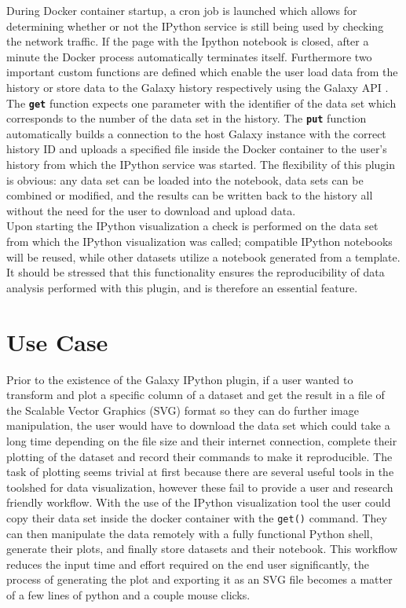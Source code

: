 \documentclass{bioinfo}
\begin{document}
\begin{methods}
During Docker container startup, a cron job is launched which allows for determining whether or not the IPython service is still being used by checking the network traffic. If the page with the Ipython notebook is closed, after a minute the Docker process automatically terminates itself. Furthermore two important custom functions are defined which enable the user load data from the history or store data to the Galaxy history respectively using the Galaxy API \citep{Sloggett2013}. The \textbf{\texttt{get}} function expects one parameter with the identifier of the data set which corresponds to the number of the data set in the history. The \textbf{\texttt{put}} function automatically builds a connection to the host Galaxy instance with the correct history ID and uploads a specified file inside the Docker container to the user's history from which the IPython service was started. The flexibility of this plugin is obvious: any data set can be loaded into the notebook, data sets can be combined or modified, and the results can be written back to the history all without the need for the user to download and upload data. \\
Upon starting the IPython visualization a check is performed on the data set from which the IPython visualization was called; compatible IPython notebooks will be reused, while other datasets utilize a notebook generated from a template. It should be stressed that this functionality ensures the reproducibility of data analysis performed with this plugin, and is therefore an essential feature.


\section{Use Case}

Prior to the existence of the Galaxy IPython plugin, if a user wanted to transform and plot a specific column of a dataset and get the result in a file of the Scalable Vector Graphics (SVG) format so they can do further image manipulation, the user would have to download the data set which could take a long time depending on the file size and their internet connection, complete their plotting of the dataset and record their commands to make it reproducible. The task of plotting seems trivial at first because there are several useful tools in the toolshed for data visualization, however these fail to provide a user and research friendly workflow. With the use of the IPython visualization tool the user could copy their data set inside the docker container with the \texttt{get()} command. They can then manipulate the data remotely with a fully functional Python shell, generate their plots, and finally store datasets and their notebook. This workflow reduces the input time and effort required on the end user significantly, the process of generating the plot and exporting it as an SVG file becomes a matter of a few lines of python and a couple mouse clicks.


\end{methods}
\end{document}
